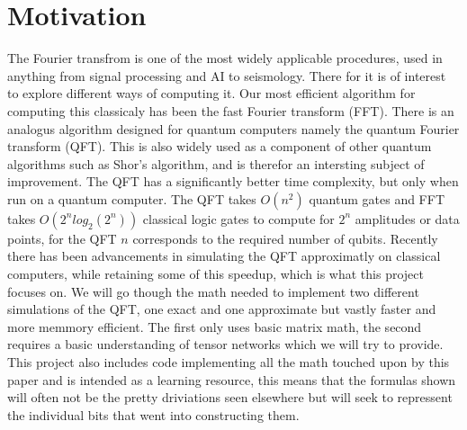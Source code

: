 \section{Motivation}
The Fourier transfrom is one of the most widely applicable procedures, used in anything from signal processing and AI to seismology. There for it is of interest to explore different ways of computing it. 
Our most efficient algorithm for computing this classicaly has been the fast Fourier transform (FFT). There is an analogus algorithm designed for quantum computers namely the quantum Fourier transform (QFT). 
This is also widely used as a component of other quantum algorithms such as Shor's algorithm, and is therefor an intersting subject of improvement. 
The QFT has a significantly better time complexity, but only when run on a quantum computer. The QFT takes $O(n^2)$ quantum gates and FFT takes $O(2^n log_{2}(2^n))$ classical logic gates to compute for $2^n$ amplitudes or data points, for the QFT $n$ corresponds to the required number of qubits. 
Recently there has been advancements in simulating the QFT approximatly on classical computers, while retaining some of this speedup, which is what this project focuses on. We will go though the math needed to implement two different simulations of the QFT, one exact and one approximate but vastly faster and more memmory efficient. The first only uses basic matrix math, the second requires a basic understanding of tensor networks which we will try to provide. This project also includes code implementing all the math touched upon by this paper and is intended as a learning resource, this means that the formulas shown will often not be the pretty driviations seen elsewhere but will seek to repressent the individual bits that went into constructing them.  
